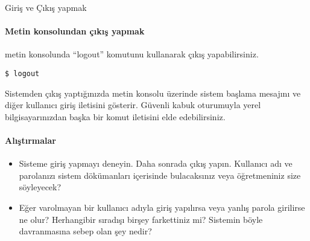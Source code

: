 \begin{section}{Giriş ve Çıkış yapmak}
\paragraph{Metin konsolundan çıkış yapmak}{metin konsolunda “logout” komutunu kullanarak çıkış yapabilirsiniz.}

\begin{verbatim}
$ logout
\end{verbatim}

Sistemden çıkış yaptığınızda metin konsolu üzerinde sistem başlama mesajını ve diğer kullanıcı giriş iletisini gösterir. Güvenli kabuk oturumuyla yerel bilgisayarınızdan başka bir komut iletisini elde edebilirsiniz. 

\paragraph{Alıştırmalar}{
\begin{itemize}
 \item Sisteme giriş yapmayı deneyin. Daha sonrada çıkış yapın. Kullanıcı adı ve parolanızı sistem dökümanları içerisinde bulacaksınız veya öğretmeniniz size söyleyecek?
 \item Eğer varolmayan bir kullanıcı adıyla giriş yapılırsa veya yanlış parola girilirse ne olur? Herhangibir sıradışı birşey farkettiniz mi? Sistemin böyle davranmasına sebep olan şey nedir?
\end{itemize}}
\end{section}


